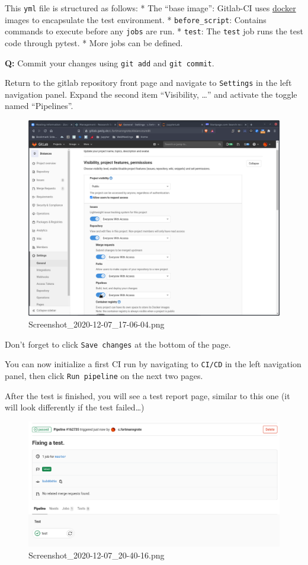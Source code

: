 \documentclass[11pt]{article}
\begin{document}
This \texttt{yml} file is structured as follows: * The ``base image'':
Gitlab-CI uses \href{https://docker.io}{docker} images to encapsulate
the test environment. * \texttt{before\_script}: Contains commands to
execute before any \texttt{jobs} are run. * \texttt{test}: The
\texttt{test} job runs the test code through pytest. * More jobs can be
defined.

    \textbf{Q:} Commit your changes using \texttt{git\ add} and
\texttt{git\ commit}.

Return to the gitlab repository front page and navigate to
\texttt{Settings} in the left navigation panel. Expand the second item
``Visibility, \ldots{}'' and activate the toggle named ``Pipelines''.

\begin{figure}
\centering
\includegraphics{static/settings.png}
\caption{Screenshot\_2020-12-07\_17-06-04.png}
\end{figure}

    Don't forget to click \texttt{Save\ changes} at the bottom of the page.

    You can now initialize a first CI run by navigating to \texttt{CI/CD} in
the left navigation panel, then click \texttt{Run\ pipeline} on the next
two pages.

After the test is finished, you will see a test report page, similar to
this one (it will look differently if the test failed\ldots)

\begin{figure}
\centering
\includegraphics{static/CI.png}
\caption{Screenshot\_2020-12-07\_20-40-16.png}
\end{figure}
\end{document}
